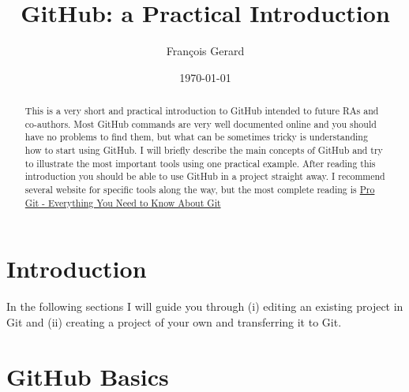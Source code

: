 \documentclass[12pt]{article}
\begin{document}
\title{GitHub: a Practical Introduction} %
\author{Fran\c{c}ois Gerard} %


\date{\today}  %

\maketitle  %



\begin{abstract} 
	This is a very short and practical introduction to GitHub intended to future RAs and co-authors. Most GitHub commands are very well documented online and you should have no problems to find them, but what can be sometimes tricky is understanding how to start using GitHub. I will briefly describe the main concepts of GitHub and try to illustrate the most important tools using one practical example. After reading this introduction you should be able to use GitHub in a project straight away. I recommend several website for specific tools along the way, but the most complete reading is \href{https://git-scm.com/book/en/v2}{Pro Git - Everything You Need to Know About Git} %
\end{abstract}

\section{Introduction}
	 
    In the following sections I will guide you through (i) editing an existing project in Git and (ii) creating a project of your own and transferring it to Git.
    
    
\section{GitHub Basics}
\end{document}
